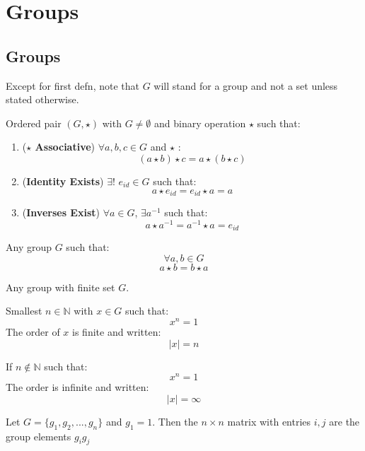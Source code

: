 \chapter{Groups}

\section{Groups}
Except for first defn, note that $G$ will stand for a group and not a set unless stated otherwise.
\begin{defn}[Group]
	Ordered pair $(G, \star)$ with $G \not = \emptyset $ and binary operation $\star$  such that:
	\begin{enumerate}
		\item (\textbf{$\star$ Associative}) $\forall a,b,c \in G$ and $\star$ :
		\[(a \star b) \star c = a \star (b \star c) \]
		\item (\textbf{Identity Exists}) $\exists!$ ${e}_{id} \in G$ such that:
		\[a \star {e}_{id} = {e}_{id} \star a =  a \]
		\item (\textbf{Inverses Exist}) $\forall a \in G$, $\exists {a}^{-1}$ such that: 
		\[ a\star{a}^{-1} = {a}^{-1}\star a = {e}_{id} \] 
	\end{enumerate}
\end{defn}

\begin{defn}
	Any group $G$ such that:
	\[\forall a, b \in G\]
	\[a \star b = b \star a\]	
\end{defn}

\begin{defn}
	Any group with finite set $G$.
\end{defn}

\begin{defn}
	Smallest $n \in \mathbb{N}$ with $x \in G$ such that:
	\[{x}^{n} = 1\]
	The order of $x$ is finite and written:
	\[|x| = n\]
\end{defn}

\begin{defn}
	If $n \not \in \mathbb{N}$ such that:
	\[{x}^{n} = 1\]
	The order is infinite and written:
	\[|x| = \infty \]
\end{defn}

\begin{defn}
	Let $G = \{{g}_{1}, {g}_{2},...,{g}_{n}\}$ and ${g}_{1} = 1$. Then the $n \times n$ matrix with entries $i, j$ are the group elements ${g}_{i}{g}_{j}$
\end{defn}

